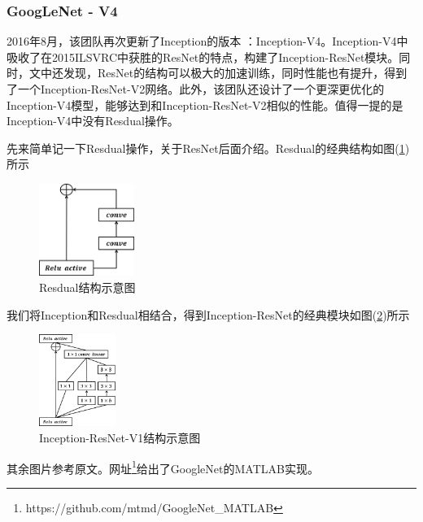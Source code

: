         \subsubsection{GoogLeNet - V4}
            \par
            2016年8月，该团队再次更新了Inception的版本\cite{2016.Szegedy} ：Inception-V4。Inception-V4中吸收了在2015ILSVRC中获胜的ResNet的特点，构建了Inception-ResNet模块。同时，文\cite{2016.Szegedy}中还发现，ResNet的结构可以极大的加速训练，同时性能也有提升，得到了一个Inception-ResNet-V2网络。此外，该团队还设计了一个更深更优化的Inception-V4模型，能够达到和Inception-ResNet-V2相似的性能。值得一提的是Inception-V4中没有Resdual操作。
            \par
            先来简单记一下Resdual操作，关于ResNet后面介绍。Resdual的经典结构如图(\ref{fig:Resdual结构示意图})所示
             \begin{figure}[H]
            \centering
            \includegraphics[height=3cm]{images/Resdual_structure.jpg}
            \caption{Resdual结构示意图}
            \label{fig:Resdual结构示意图}
            \end{figure}
            我们将Inception和Resdual相结合，得到Inception-ResNet的经典模块如图(\ref{fig:Inception-ResNet-V1结构示意图})所示
             \begin{figure}[H]
            \centering
            \includegraphics[height=3cm]{images/Inception-ResNet-V1_structure.jpg}
            \caption{Inception-ResNet-V1结构示意图}
            \label{fig:Inception-ResNet-V1结构示意图}
            \end{figure}
            其余图片参考原文。网址\footnote{https://github.com/mtmd/GoogleNet\_MATLAB}给出了GoogleNet的MATLAB实现。

